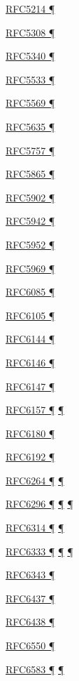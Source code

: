 \documentclass[
]{article}
\begin{document}
\hyperref[obsolete-techniques]{RFC5214 ¶}

\hyperref[routing]{RFC5308 ¶}

\hyperref[routing]{RFC5340 ¶}

\hyperref[multihoming]{RFC5533 ¶}

\hyperref[obsolete-techniques]{RFC5569 ¶}

\hyperref[filtering]{RFC5635 ¶}

\hyperref[address-resolution]{RFC5757 ¶}

\hyperref[traffic-class-and-flow-label]{RFC5865 ¶}

\hyperref[translation-and-ipv4-as-a-service]{RFC5902 ¶}

\hyperref[auto-configuration]{RFC5942 ¶}

\hyperref[addresses]{RFC5952 ¶}

\hyperref[tunnels]{RFC5969 ¶}

\hyperref[layer-2-functions]{RFC6085 ¶}

\hyperref[layer-2-considerations]{RFC6105 ¶}

\hyperref[translation-and-ipv4-as-a-service]{RFC6144 ¶}

\hyperref[translation-and-ipv4-as-a-service]{RFC6146 ¶}

\hyperref[translation-and-ipv4-as-a-service]{RFC6147 ¶}

\hyperref[dual-stack-scenarios]{RFC6157 ¶} \hyperref[multihoming]{¶}

\hyperref[coexistence-with-legacy-ipv4]{RFC6180 ¶}

\hyperref[filtering]{RFC6192 ¶}

\hyperref[obsolete-techniques]{RFC6264 ¶} \hyperref[tunnels]{¶}

\hyperref[translation-and-ipv4-as-a-service]{RFC6296 ¶}
\hyperref[security]{¶} \hyperref[multihoming]{¶}

\hyperref[translation-and-ipv4-as-a-service]{RFC6314 ¶}
\hyperref[multihoming]{¶}

\hyperref[dual-stack-scenarios]{RFC6333 ¶}
\hyperref[translation-and-ipv4-as-a-service]{¶} \hyperref[tunnels]{¶}

\hyperref[obsolete-techniques]{RFC6343 ¶}

\hyperref[traffic-class-and-flow-label]{RFC6437 ¶}

\hyperref[traffic-class-and-flow-label]{RFC6438 ¶}

\hyperref[routing]{RFC6550 ¶}

\hyperref[address-resolution]{RFC6583 ¶}
\hyperref[layer-2-considerations]{¶}
\end{document}
